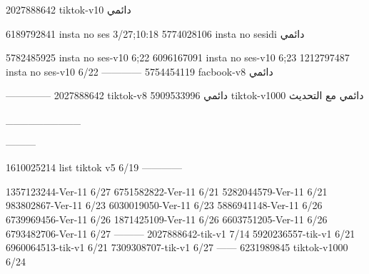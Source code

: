 2027888642 tiktok-v10
دائمي

6189792841 insta no ses
3/27;10:18
5774028106 insta no sesidi
دائمي


5782485925 insta no ses-v10
6;22
6096167091 insta no ses-v10
6;23
1212797487 insta no ses-v10
6/22
------------
5754454119 facbook-v8
دائمي


--------------
2027888642 tiktok-v8
دائمي
5909533996 tiktok-v1000
دائمي مع التحديث

__________

---------

1610025214 list tiktok v5
6/19
------------

1357123244-Ver-11
6/27
6751582822-Ver-11
6/21
5282044579-Ver-11
6/21
983802867-Ver-11
6/23
6030019050-Ver-11
6/23
5886941148-Ver-11
6/26
6739969456-Ver-11
6/26
1871425109-Ver-11
6/26
6603751205-Ver-11
6/26
6793482706-Ver-11
6/27
---------
2027888642-tik-v1
7/14
5920236557-tik-v1
6/21
6960064513-tik-v1
6/21
7309308707-tik-v1
6/27
------
6231989845 tiktok-v1000
6/24
